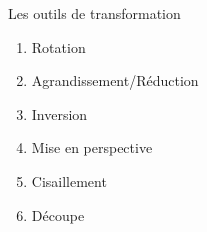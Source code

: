 \documentclass[10pt,svgnames,usenames,table]{beamer}
\begin{document}
\begin{frame}[allowframebreaks]{Les outils de transformation}
\begin{enumerate}
	\item Rotation 
	
	\item Agrandissement/Réduction 
		
	\item Inversion 
	
	\item Mise en perspective 
	
	\item Cisaillement 
	
	\item Découpe
\end{enumerate}
\end{frame}
\end{document}
